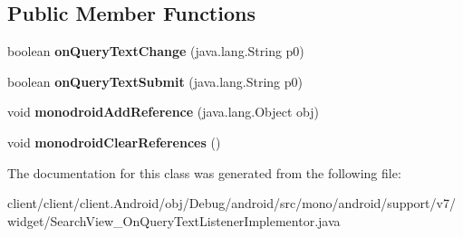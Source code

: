 \subsection*{Public Member Functions}
\begin{DoxyCompactItemize}
\item 
\hypertarget{classmono_1_1android_1_1support_1_1v7_1_1widget_1_1SearchView__OnQueryTextListenerImplementor_a37164a1e4575c60d88089e3d3ae36c55}{}boolean {\bfseries on\+Query\+Text\+Change} (java.\+lang.\+String p0)\label{classmono_1_1android_1_1support_1_1v7_1_1widget_1_1SearchView__OnQueryTextListenerImplementor_a37164a1e4575c60d88089e3d3ae36c55}

\item 
\hypertarget{classmono_1_1android_1_1support_1_1v7_1_1widget_1_1SearchView__OnQueryTextListenerImplementor_ab4143af34811f748cd0c6cfcda75237a}{}boolean {\bfseries on\+Query\+Text\+Submit} (java.\+lang.\+String p0)\label{classmono_1_1android_1_1support_1_1v7_1_1widget_1_1SearchView__OnQueryTextListenerImplementor_ab4143af34811f748cd0c6cfcda75237a}

\item 
\hypertarget{classmono_1_1android_1_1support_1_1v7_1_1widget_1_1SearchView__OnQueryTextListenerImplementor_aa5801bb2e02637a33a8f7dd14016f759}{}void {\bfseries monodroid\+Add\+Reference} (java.\+lang.\+Object obj)\label{classmono_1_1android_1_1support_1_1v7_1_1widget_1_1SearchView__OnQueryTextListenerImplementor_aa5801bb2e02637a33a8f7dd14016f759}

\item 
\hypertarget{classmono_1_1android_1_1support_1_1v7_1_1widget_1_1SearchView__OnQueryTextListenerImplementor_ac9620633edcb7b40810131b0604bb68d}{}void {\bfseries monodroid\+Clear\+References} ()\label{classmono_1_1android_1_1support_1_1v7_1_1widget_1_1SearchView__OnQueryTextListenerImplementor_ac9620633edcb7b40810131b0604bb68d}

\end{DoxyCompactItemize}


The documentation for this class was generated from the following file\+:\begin{DoxyCompactItemize}
\item 
client/client/client.\+Android/obj/\+Debug/android/src/mono/android/support/v7/widget/Search\+View\+\_\+\+On\+Query\+Text\+Listener\+Implementor.\+java\end{DoxyCompactItemize}
